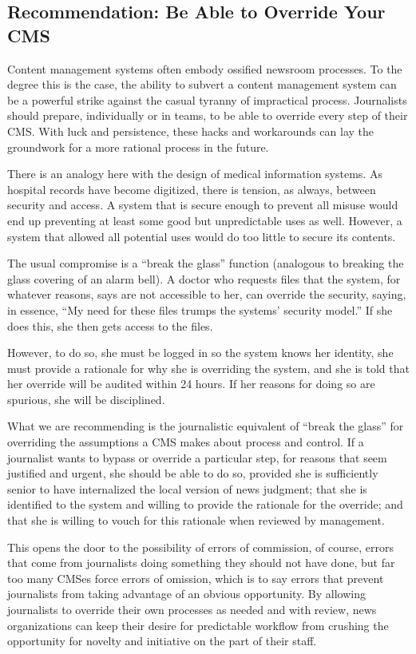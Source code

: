 \subsection{Recommendation: Be Able to Override Your CMS}
Content management systems often embody ossified newsroom processes.
To the degree this is the case, the ability to subvert a content
management system can be a powerful strike against the casual tyranny
of impractical process. Journalists should prepare, individually or
in teams, to be able to override every step of their CMS. With luck and
persistence, these hacks and workarounds can lay the groundwork for a
more rational process in the future.

There is an analogy here with the design of medical information systems.
As hospital records have become digitized, there is tension, as
always, between security and access. A system that is secure enough
to prevent all misuse would end up preventing at least some good but
unpredictable uses as well. However, a system that allowed all potential
uses would do too little to secure its contents.

The usual compromise is a ``break the glass'' function (analogous to
breaking the glass covering of an alarm bell). A doctor who requests
files that the system, for whatever reasons, says are not accessible to
her, can override the security, saying, in essence, ``My need for these
files trumps the systems’ security model.'' If she does this, she then gets
access to the files.

However, to do so, she must be logged in so the system knows her identity,
she must provide a rationale for why she is overriding the system,
and she is told that her override will be audited within 24 hours. If her
reasons for doing so are spurious, she will be disciplined.

What we are recommending is the journalistic equivalent of ``break
the glass'' for overriding the assumptions a CMS makes about process
and control. If a journalist wants to bypass or override a particular step,
for reasons that seem justified and urgent, she should be able to do so,
provided she is sufficiently senior to have internalized the local version
of news judgment; that she is identified to the system and willing to
provide the rationale for the override; and that she is willing to vouch
for this rationale when reviewed by management.

This opens the door to the possibility of errors of commission, of course,
errors that come from journalists doing something they should not
have done, but far too many CMSes force errors of omission, which is
to say errors that prevent journalists from taking advantage of an obvious
opportunity. By allowing journalists to override their own processes
as needed and with review, news organizations can keep their desire for
predictable workflow from crushing the opportunity for novelty and
initiative on the part of their staff.

